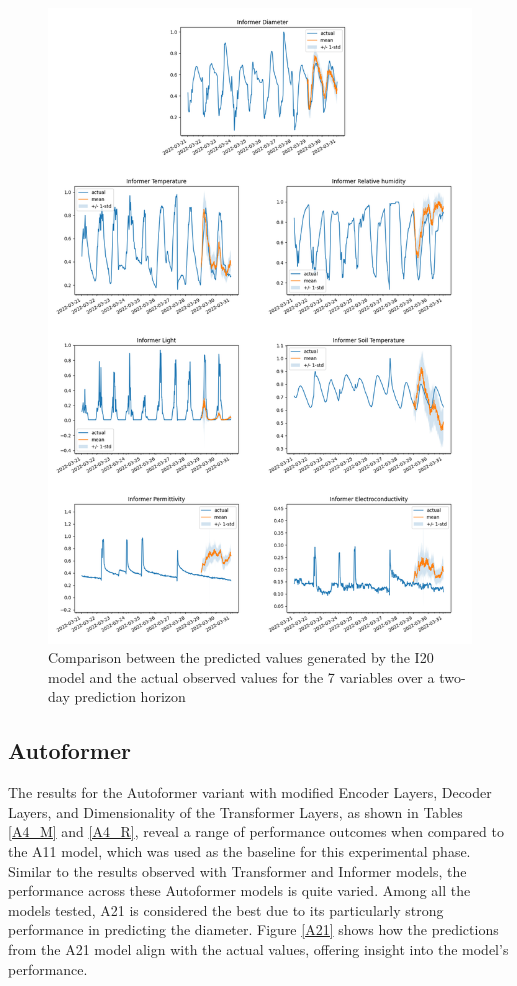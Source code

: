 \begin{figure}[htbp]
    \centering
    \includegraphics[width=15 cm]{6_ChapterResults/figuras/I20.png}
    \caption{Comparison between the predicted values generated by the I20 model and the actual observed values for the 7 variables over a two-day prediction horizon}
    \label{I20}
\end{figure}

\subsection{Autoformer}
The results for the Autoformer variant with modified Encoder Layers, Decoder Layers, and Dimensionality of the Transformer Layers, as shown in Tables \ref{A4_M} and \ref{A4_R}, reveal a range of performance outcomes when compared to the A11 model, which was used as the baseline for this experimental phase. Similar to the results observed with Transformer and Informer models, the performance across these Autoformer models is quite varied. Among all the models tested, A21 is considered the best due to its particularly strong performance in predicting the diameter. Figure \ref{A21} shows how the predictions from the A21 model align with the actual values, offering insight into the model's performance.

